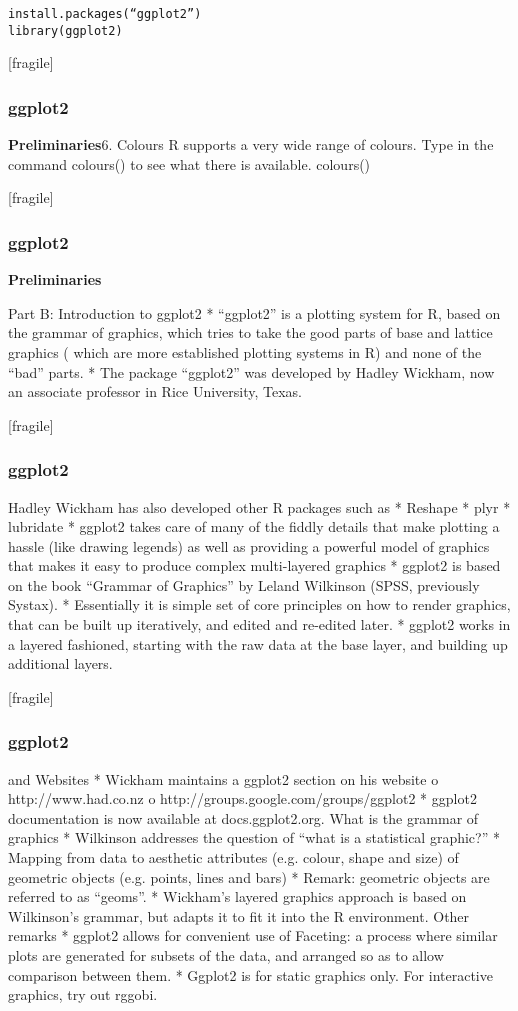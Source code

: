 \begin{verbatim}
install.packages(“ggplot2”) 
library(ggplot2)
\end{verbatim}


[fragile]
\frametitle{ggplot2}
\large
\noindent \textbf{Preliminaries}6. Colours
R supports a very wide range of colours. Type in the command colours() to see what there is available. colours()


[fragile]
\frametitle{ggplot2}
\large
\noindent \textbf{Preliminaries}


Part B: Introduction to ggplot2
* “ggplot2” is a plotting system for R, based on the grammar of graphics, which tries to take the good parts of base and lattice graphics ( which are more established plotting systems in R) and none of the “bad” parts.
* The package “ggplot2” was developed by Hadley Wickham, now an associate professor in Rice University, Texas.

[fragile]
\frametitle{ggplot2}
\large
Hadley Wickham has also developed other R packages such as
* Reshape
* plyr
* lubridate
* ggplot2 takes care of many of the fiddly details that make plotting a hassle (like drawing legends) as well as providing a powerful model of graphics that makes it easy to produce complex multi-layered graphics
* ggplot2 is based on the book “Grammar of Graphics” by Leland Wilkinson (SPSS, previously Systax).
* Essentially it is simple set of core principles on how to render graphics, that can be built up iteratively, and edited and re-edited later.
* ggplot2 works in a layered fashioned, starting with the raw data at the base layer, and building up additional layers.

[fragile]
\frametitle{ggplot2}
\largeDocumentation and Websites
* Wickham maintains a ggplot2 section on his website
o http://www.had.co.nz
o http://groups.google.com/groups/ggplot2
* ggplot2 documentation is now available at docs.ggplot2.org.
What is the grammar of graphics
* Wilkinson addresses the question of “what is a statistical graphic?”
* Mapping from data to aesthetic attributes (e.g. colour, shape and size) of geometric objects (e.g. points, lines and bars)
* Remark: geometric objects are referred to as “geoms”.
* Wickham’s layered graphics approach is based on Wilkinson’s grammar, but adapts it to fit it into the R environment.
Other remarks
* ggplot2 allows for convenient use of Faceting: a process where similar plots are generated for subsets of the data, and arranged so as to allow comparison between them.
* Ggplot2 is for static graphics only. For interactive graphics, try out rggobi.

